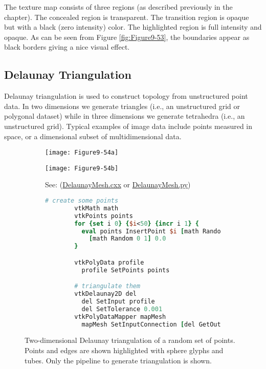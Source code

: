 The texture map consists of three regions (as described previously in the chapter). The concealed region is transparent. The transition region is opaque but with a black (zero intensity) color. The highlighted region is full intensity and opaque. As can be seen from Figure \ref{fig:Figure9-53}, the boundaries appear as black borders giving a nice visual effect.

\subsection{Delaunay Triangulation}

Delaunay triangulation is used to construct topology from unstructured point data. In two dimensions we generate triangles (i.e., an unstructured grid or polygonal dataset) while in three dimensions we generate tetrahedra (i.e., an unstructured grid). Typical examples of image data include points measured in space, or a dimensional subset of multidimensional data.

\begin{figure}[htb]
    \centering
	\begin{subfigure}[h]{0.48\linewidth}
		\texttt{[image: Figure9-54a]}
		\captionsetup{justification=centering}
		\caption*{}
		\label{fig:Figure9-54a}
	\end{subfigure}
	\hfill
	\begin{subfigure}[h]{0.48\linewidth}
		\texttt{[image: Figure9-54b]}
		\captionsetup{justification=centering}
		\caption*{See: (\href{https://lorensen.github.io/VTKExamples/site/Cxx/Modelling/DelaunayMesh/}{DelaunayMesh.cxx} or \href{https://lorensen.github.io/VTKExamples/site/Python/Modelling/DelaunayMesh/}{DelaunayMesh.py})}
        \label{fig:Figure9-54b}
	\end{subfigure}
	\hfill
	\begin{subfigure}[h]{0.96\linewidth}
        \begin{lstlisting}[language=TCL,  caption={}, numbers=none, frame=none]
        # create some points
        vtkMath math
        vtkPoints points
        for {set i 0} {$i<50} {incr i 1} {
          eval points InsertPoint $i [math Random 0 1] \
            [math Random 0 1] 0.0
        }

        vtkPolyData profile
          profile SetPoints points

        # triangulate them
        vtkDelaunay2D del
          del SetInput profile
          del SetTolerance 0.001
        vtkPolyDataMapper mapMesh
          mapMesh SetInputConnection [del GetOutputPort]
        \end{lstlisting}
        \label{fig:Figure9-54d}
	\end{subfigure}
	\caption{Two-dimensional Delaunay triangulation of a random set of points. Points and edges are shown highlighted with sphere glyphs and tubes. Only the pipeline to generate triangulation is shown.}\label{fig:Figure9-54}
\end{figure}

